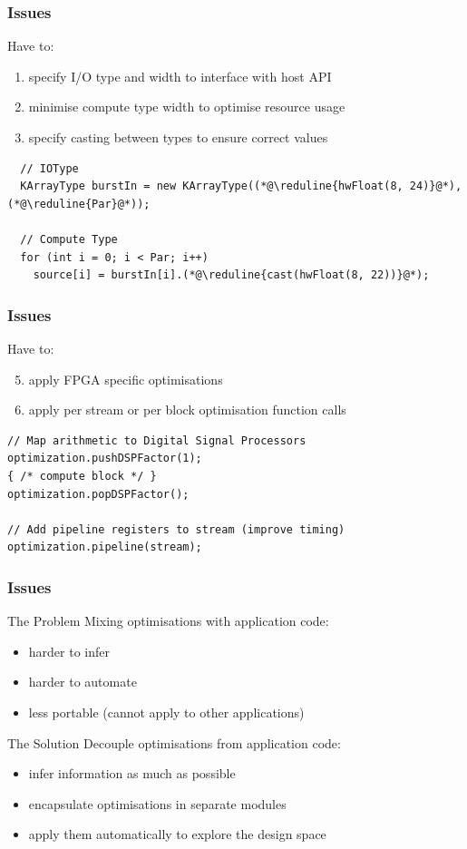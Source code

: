\begin{frame}[fragile]
  \frametitle{Issues}
  Have to:
  \begin{enumerate}

    \item specify I/O type and width to interface with host API
    \item minimise compute type width to optimise resource usage
    \item specify casting between types to ensure correct values
    \end{enumerate}

\begin{lstlisting}
  // IOType
  KArrayType burstIn = new KArrayType((*@\reduline{hwFloat(8, 24)}@*), (*@\reduline{Par}@*));

  // Compute Type
  for (int i = 0; i < Par; i++)
    source[i] = burstIn[i].(*@\reduline{cast(hwFloat(8, 22))}@*);
  \end{lstlisting}
\end{frame}

\begin{frame}[fragile]
  \frametitle{Issues}
  Have to:
  \begin{enumerate}
    \setcounter{enumi}{4}
      \item apply FPGA specific optimisations
      \item apply per stream or per block optimisation function calls
      \end{enumerate}
    \begin{lstlisting}
// Map arithmetic to Digital Signal Processors
optimization.pushDSPFactor(1);
{ /* compute block */ }
optimization.popDSPFactor();

// Add pipeline registers to stream (improve timing)
optimization.pipeline(stream);

    \end{lstlisting}
\end{frame}

\begin{frame}[fragile]
  \frametitle{Issues}
    \begin{beamerboxesrounded}{The Problem}
      Mixing optimisations with application code:
      \begin{itemize}
        \item harder to infer
        \item harder to automate
        \item less portable (cannot apply to other applications)
      \end{itemize}
    \end{beamerboxesrounded}
    \begin{beamerboxesrounded}{The Solution}
      Decouple optimisations from application code:
    \begin{itemize}
    \item infer information as much as possible
    \item encapsulate optimisations in separate modules
    \item apply them automatically to explore the design space
    \end{itemize}
    \end{beamerboxesrounded}
\end{frame}
